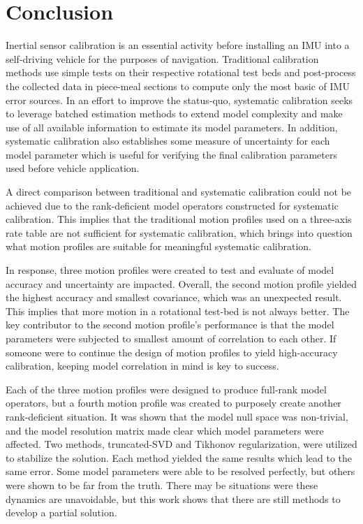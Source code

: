 
\begingroup
\allowdisplaybreaks

\section{Conclusion}

Inertial sensor calibration is an essential activity before installing an IMU into a self-driving vehicle for the purposes of navigation. Traditional calibration methods use simple tests on their respective rotational test beds and post-process the collected data in piece-meal sections to compute only the most basic of IMU error sources. In an effort to improve the status-quo, systematic calibration seeks to leverage batched estimation methods to extend model complexity and make use of all available information to estimate its model parameters. In addition, systematic calibration also establishes some measure of uncertainty for each model parameter which is useful for verifying the final calibration parameters used before vehicle application. 

A direct comparison between traditional and systematic calibration could not be achieved due to the rank-deficient model operators constructed for systematic calibration. This implies that the traditional motion profiles used on a three-axis rate table are not sufficient for systematic calibration, which brings into question what motion profiles are suitable for meaningful systematic calibration. 

In response, three motion profiles were created to test and evaluate of model accuracy and uncertainty are impacted. Overall, the second motion profile yielded the highest accuracy and smallest covariance, which was an unexpected result. This implies that more motion in a rotational test-bed is not always better. The key contributor to the second motion profile's performance is that the model parameters were subjected to smallest amount of correlation to each other. If someone were to continue the design of motion profiles to yield high-accuracy calibration, keeping model correlation in mind is key to success. 

Each of the three motion profiles were designed to produce full-rank model operators, but a fourth motion profile was created to purposely create another rank-deficient situation. It was shown that the model null space was non-trivial, and the model resolution matrix made clear which model parameters were affected. Two methods, truncated-SVD and Tikhonov regularization, were utilized to stabilize the solution. Each method yielded the same results which lead to the same error. Some model parameters were able to be resolved perfectly, but others were shown to be far from the truth. There may be situations were these dynamics are unavoidable, but this work shows that there are still methods to develop a partial solution. 


